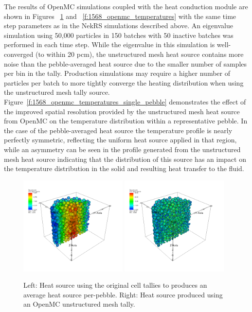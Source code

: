 The results of OpenMC simulations coupled with the heat conduction module are shown in Figures ~\ref{f:1568_openmc_heat_source} and ~\ref{f:1568_openmc_temperatures} with the same time step parameters as in the NekRS simulations described above. An eigenvalue simulation using 50,000 particles in 150 batches with 50 inactive batches was performed in each time step. While the eigenvalue in this simulation is well-converged (to within 20 pcm), the unstructured mesh heat source contains more noise than the pebble-averaged heat source due to the smaller number of samples per bin in the tally. Production simulations may require a higher number of particles per batch to more tightly converge the heating distribution when using the unstructured mesh tally source. Figure~\ref{f:1568_openmc_temperatures_single_pebble} demonstrates the effect of the improved spatial resolution provided by the unstructured mesh heat source from OpenMC on the temperature distribution within a representative pebble. In the case of the pebble-averaged heat source the temperature profile is nearly perfectly symmetric, reflecting the uniform heat source applied in that region, while an asymmetry can be seen in the profile generated from the unstructured mesh heat source indicating that the distribution of this source has an impact on the temperature distribution in the solid and resulting heat transfer to the fluid.

\begin{figure}[!h]
\centering
\includegraphics[clip=true,width=0.48\textwidth]{Figures/openmc_cell_heat_source}
\includegraphics[clip=true,width=0.48\textwidth]{Figures/openmc_mesh_heat_source}
\caption{Left: Heat source using the original cell tallies to produces an average heat source per-pebble. Right: Heat source produced using an OpenMC unstructured mesh tally.}
\label{f:1568_openmc_heat_source}
\end{figure}

